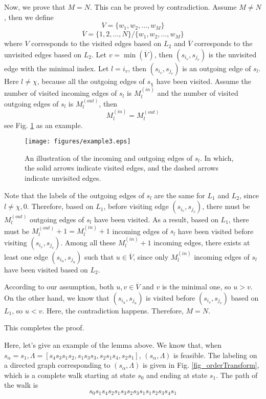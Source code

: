 \documentclass[journal]{IEEEtran}
\begin{document}
Now, we prove that $M=N$. This can be proved by contradiction. Assume $M\neq N$, then we define
$$V=\{w_1,w_2,...,w_M\}$$
$$\overline{V}=\{1,2,...,N\}/\{w_1,w_2,...,w_M\}$$
where $V$ corresponds to the visited edges based on $L_2$ and $\overline{V}$ corresponds to the unvisited edges based on $L_2$.
Let $v=\min (\overline{V})$, then $(s_{i_v},s_{j_v})$ is the unvisited edge with the minimal index.
Let $l=i_v$, then $(s_{i_v},s_{j_v})$ is an outgoing edge of $s_{l}$. Here $l\neq\chi$, because all the
outgoing edges of $s_\chi$ have been visited. Assume the number of visited incoming edges of $s_l$ is
$M_l^{(in)}$ and the number of visited outgoing edges of $s_l$ is $M_l^{(out)}$, then
$$M_l^{(in)}=M_l^{(out)}$$
see Fig. \ref{fig_example3} as an example.

\begin{figure}[!h]
\centering
\texttt{[image: figures/example3.eps]}
\caption{An illustration of the incoming and outgoing edges of $s_l$. In which, the solid arrows indicate visited edges, and the dashed arrows indicate unvisited edges.}
\label{fig_example3}
\end{figure}

Note that the labels of the outgoing edges of $s_l$ are the same for $L_1$ and $L_2$, since $l\neq \chi,0$. Therefore, based on $L_1$, before visiting edge $(s_{i_v},s_{j_v})$,
there must be $M_l^{(out)}$ outgoing edges of $s_l$ have been visited. As a result, based on $L_1$, there must be $M_l^{(out)}+1=M_l^{(in)}+1$ incoming edges of $s_l$ have been visited before visiting $(s_{i_v},s_{j_v})$. Among all these $M_l^{(in)}+1$
incoming edges, there exists at least one edge $(s_{i_u}, s_{j_u})$ such that $u \in \overline{V}$, since only $M_l^{(in)}$ incoming edges of $s_l$ have been visited based on $L_2$.

According to our assumption, both $u,v\in \overline{V}$ and $v$ is the minimal one, so $u>v$. On the other hand, we know that $(s_{i_u}, s_{j_u})$ is visited before $(s_{i_v},s_{j_v})$ based on $L_1$, so $u<v$. Here, the contradiction happens. Therefore, $M=N$.

This completes the proof.
\hfill\QED

Here, let's give an example of the lemma above. We know that, when $s_\alpha=s_1, \Lambda=[s_4 s_3 s_1s_2,s_1 s_3 s_3,s_2s_1 s_4, s_2 s_1]$,
$(s_\alpha, \Lambda)$ is feasible. The labeling on a directed graph corresponding to $(s_\alpha, \Lambda)$ is given in Fig. \ref{fig_orderTransform}, which is a complete walk starting at state $s_0$ and ending at state $s_1$. The path of the walk is
$$s_0s_1s_4s_2 s_1 s_3s_2 s_3 s_1 s_1s_2s_3 s_4s_1$$
\end{document}
